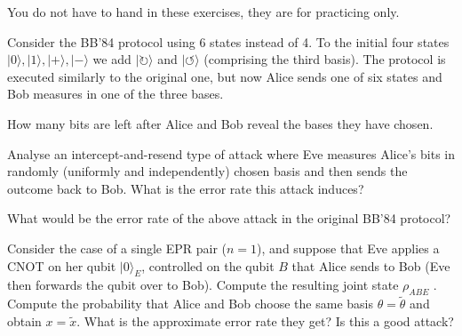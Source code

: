 \documentclass[a4paper,10pt,landscape,twocolumn]{scrartcl}
\newcommand{\ket}[1]{| #1 \rangle}
\begin{document}
\practiceproblems

{\sffamily\noindent
You do not have to hand in these exercises, they are for practicing only. %
}

\begin{exercise}
Consider the BB'84 protocol using 6 states instead of 4. To the initial four states $\ket{0}, \ket{1}, \ket{+}, \ket{-}$ we add $\ket{\circlearrowright}$ and $\ket{\circlearrowleft}$ (comprising the third basis). The protocol is executed similarly to the original one, but now Alice sends one of six states and Bob measures in one of the three bases.
\begin{subex}
How many bits are left after Alice and Bob reveal the bases they have chosen.
\end{subex}

\begin{subex}
Analyse an intercept-and-resend type of attack where Eve measures Alice's bits in randomly (uniformly and independently) chosen basis and then sends the outcome back to Bob. What is the error rate this attack induces?
\end{subex}

\begin{subex}
What would be the error rate of the above attack in the original BB'84 protocol?
\end{subex}
\end{exercise}

\begin{exercise}
Consider the case of a single EPR pair ($n = 1$), and suppose that Eve applies a
CNOT on her qubit $\ket{0}_E$, controlled on the qubit $B$ that Alice sends to Bob (Eve then forwards
the qubit over to Bob). Compute the resulting joint state $\rho_{ABE}$ . Compute the probability that
Alice and Bob choose the same basis $\theta=\tilde{\theta}$ and obtain $x=\tilde{x}$. What is the approximate error rate they get? Is this a good attack?
\end{exercise}
\end{document}

